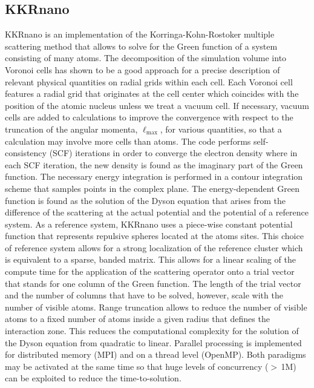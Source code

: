 \documentclass{llncs}
\newcommand{\ellmax}{\ell_{\mathrm{max}}}
\def\KKRnano{{KKRnano}}
\begin{document}
\subsection{KKRnano} \label{section:kkrnano}
\KKRnano{} is an implementation of the Korringa-Kohn-Rostoker multiple scattering method \cite{PhysRevB.52.8807,PhysRevB.85.235103}
that allows to solve for the Green function of a system consisting of many atoms.
The decomposition of the simulation volume into Voronoi cells has shown to be a good
approach for a precise description of relevant physical quantities on radial grids within each cell.
Each Voronoi cell features a radial grid that originates at the cell center
which coincides with the position of the atomic nucleus unless we treat a vacuum cell.
If necessary, vacuum cells are added to calculations to improve the convergence with respect to the truncation of
the angular momenta, $\ellmax$, for various quantities, so that a calculation may involve more cells than atoms.
The code performs self-consistency (SCF) iterations in order to converge the electron density
where in each SCF iteration, the new density is found as the imaginary part of the Green function.
The necessary energy integration is performed in a contour integration scheme that
samples points in the complex plane.
The energy-dependent Green function is found as the solution of the Dyson equation
that arises from the difference of the scattering at the actual potential and the potential 
of a reference system. As a reference system, \KKRnano{} uses a piece-wise constant potential
function that represents repulsive spheres located at the atoms sites.
This choice of reference system allows for a strong localization of the reference cluster
which is equivalent to a sparse, banded matrix. 
This allows for a linear scaling of the compute time for the application of the scattering operator
onto a trial vector that stands for one column of the Green function. 
The length of the trial vector and the number of columns that have to be solved, however, scale with
the number of visible atoms.
Range truncation allows to reduce the number of visible atoms to a fixed number 
of atoms inside a given radius that defines the interaction zone. This reduces the computational
complexity for the solution of the Dyson equation from quadratic to linear.
Parallel processing is implemented for distributed memory (MPI) and on a thread level (OpenMP).
Both paradigms may be activated at the same time so that huge levels of concurrency 
($> \,$1M) can be exploited to reduce the time-to-solution.
\end{document}
